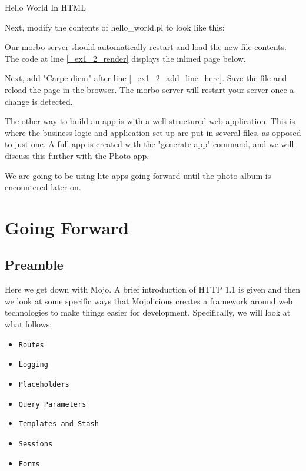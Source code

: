 \documentclass[14pt]{extreport}
\begin{document}
{\Large Hello World In HTML}

Next, modify the contents of hello\_world.pl to look like this:



Our morbo server should automatically restart and load the new file contents.
The code at line \ref{_ex1_2_render} displays the inlined page below.

Next, add "Carpe diem" after line \ref{_ex1_2_add_line_here}. Save the file and
reload the page in the browser. The morbo server will restart your server once
a change is detected.

The other way to build an app is with a well-structured web application. This
is where the business logic and application set up are put in several files, as
opposed to just one.  A full app is created with the "generate app" command,
and we will discuss this further with the Photo app.

We are going to be using lite apps going forward until the photo album is
encountered later on.

\chapter*{Going Forward}

\section{Preamble}

Here we get down with Mojo.  A brief introduction of HTTP 1.1 is given and then
we look at some specific ways that Mojolicious creates a framework around
web technologies to make things easier for development.  Specifically, we will look
at what follows:

\begin{itemize} \itemsep1pt \parskip0pt 
\item \verb|Routes|
\item \verb|Logging|
\item \verb|Placeholders|
\item \verb|Query Parameters|
\item \verb|Templates and Stash|
\item \verb|Sessions|
\item \verb|Forms|
\end{itemize}
\end{document}
